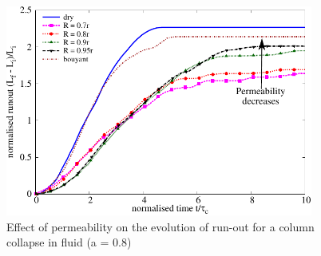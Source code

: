 \begin{figure}[htpb]
\centering
\includegraphics[width=0.9\textwidth]{Runout_a08_dense}
\caption{Effect of permeability on the evolution of run-out for a column 
collapse in fluid (a = 0.8)}
\label{fig:Runout_a08_dense}
\end{figure}

